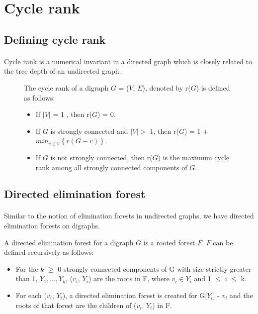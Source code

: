 \section{Cycle rank}

\subsection{Defining cycle rank}

\paragraph{}
Cycle rank is a numerical invariant in a directed graph which is closely related to the tree depth of an undirected graph.

\begin{figure}[H]
\begin{definition}
The cycle rank of a digraph $G$ = ($V$, $E$), denoted by r($G$) is defined as follows:
\begin{itemize} 
\item If $|V|$ = 1 , then r($G$) = 0.
\item If $G$ is strongly connected and  $|V| >$ 1, then r($G$) = 1 + $min_{v \in V} \left\{r(G-v)\right\}$.
\item If $G$ is not strongly connected, then r($G$) is the maximum cycle rank among all  strongly connected components of $G$.
\end{itemize}
\end{definition}
\end{figure}

\subsection{Directed elimination forest}

\paragraph{}
Similar to the notion of elimination forests in undirected graphs, we have directed elimination forests on digraphs.

\begin{definition}
A directed elimination forest for a digraph $G$ is a rooted forest $F$. $F$ can be defined recursively as follows:

\begin{itemize}
\item For the $k$ $\geq$ 0 strongly connected components of G with size strictly greater than 1, $Y_1, \ldots, Y_k$, ($v_i$, $Y_i$) are the roots in F, where $v_i \in Y_i$ and 1 $\leq$ i $\leq$ k.
\item For each ($v_i$, $Y_i$), a directed elimination forest is created for G[$Y_i$] - $v_i$ and the roots of that forest are the children of ($v_i$, $Y_i$) in F.
\end{itemize}
\label{definition:DET}
\end{definition}

